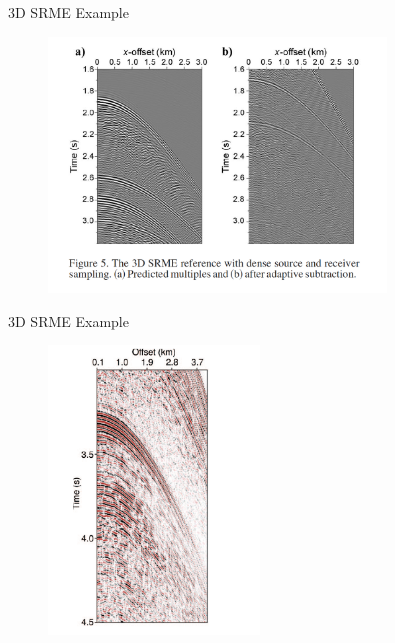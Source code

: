\documentclass[xcolor=dvipsnames,notes]{beamer}
\begin{document}
\begin{frame}{3D SRME Example}
\begin{figure}
\includegraphics[width=0.8\textwidth]{Fig/fig3.png}
\end{figure}
\end{frame}
\begin{frame}{3D SRME Example}
\begin{figure}
\includegraphics[width=0.5\textwidth]{Fig/fig5.png}
\end{figure}
\end{frame}
\end{document}

